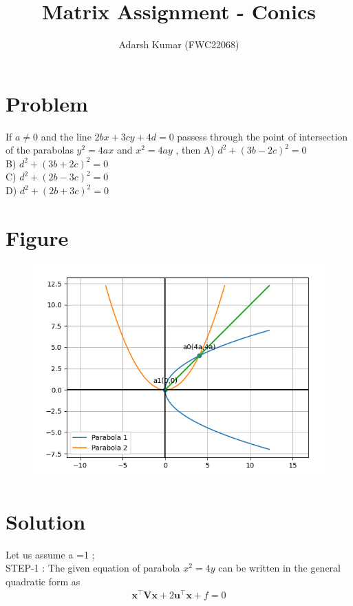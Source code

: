 \documentclass[journal,12pt,twocolumn]{IEEEtran}
\title{\mytitle}
\title{
Matrix Assignment - Conics
}
\author{Adarsh Kumar (FWC22068)}
\let\vec\mathbf
\let\vec\mathbf
\begin{document}
\maketitle
\tableofcontents
\bigskip


\section{\textbf{Problem}}
If $a \neq 0$ and the line $ 2bx+3cy+4d = 0$ passess through the point of intersection of the parabolas $ y^2 =4ax$ and $ x^2=4ay$ , then
\linebreak
A) $d^2 + (3b-2c)^2 =0 $ \\ B) $d^2 + (3b+2c)^2 =0 $\\ C) $d^2 + (2b-3c)^2 =0 $ \\D) $d^2 + (2b+3c)^2 =0 $
\\
\section{\textbf{Figure}}
\begin{figure}[h]
    \centering
\includegraphics[width=\columnwidth]{con.png}
    \label{fig:my_label}
\end{figure}
\section{\textbf{Solution}}

Let us assume a =1 ;\\
STEP-1 : 
The given equation of parabola $x^2 = 4y$ can be written in the general quadratic form as
\begin{align}
    \vec{x}^{\top}\vec{V}\vec{x}+2\vec{u}^{\top}\vec{x}+f=0
    \end{align}
 
\end{document}
